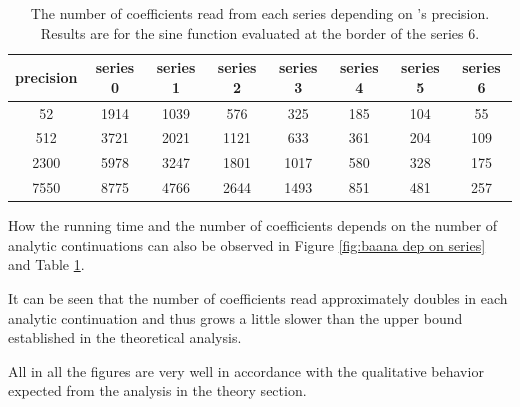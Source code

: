     \begin{table}
      \centering
      \begin{tabular}{|c||c|c|c|c|c|c|c|}
        \hline
        precision & series 0&series 1&series 2&series 3&series 4&series 5&series 6 \\ \hline
        52 &1914&1039&576&325&185&104&55 \\ \hline 
        512 &3721&2021&1121&633&361&204&109 \\ \hline
        2300 &5978&3247&1801&1017&580&328&175 \\ \hline
        7550 &8775 & 4766 & 2644 & 1493&851&481&257 \\ \hline
      \end{tabular}
      \caption{The number of coefficients read from each series depending on {\irram}'s precision. 
    Results are for the sine function evaluated at the border of the series 6.}\label{table: coefficients dep on precision} 
    \end{table}
		How the running time and the number of coefficients depends on the number of analytic continuations can also be observed in Figure \ref{fig:baana dep on series} 
    and Table \ref{table: coefficients dep on precision}.

    It can be seen that the number of coefficients read approximately doubles in each analytic continuation and thus grows 
    a little slower than the upper bound established in the theoretical analysis.

		All in all the figures are very well in accordance with the qualitative behavior expected from the analysis in the theory section.

